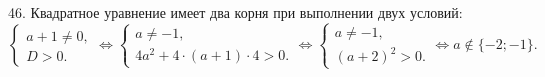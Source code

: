 46. Квадратное уравнение имеет два корня при выполнении двух условий:\\ $\begin{cases}a+1\neq0,\\ D>0.\end{cases}\Leftrightarrow
\begin{cases}a\neq-1,\\ 4a^2+4\cdot(a+1)\cdot4>0.\end{cases}\Leftrightarrow
\begin{cases}a\neq-1,\\ (a+2)^2>0.\end{cases}\Leftrightarrow a\notin\{-2;-1\}.$\\
